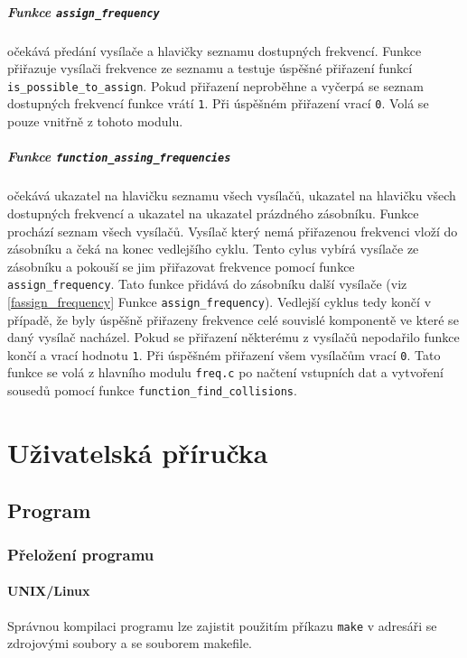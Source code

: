 \documentclass[12pt]{report}
\begin{document}
\cprotect\paragraph{Funkce \verb|assign_frequency|\label{fassign_frequency}}
očekává předání vysílače a hlavičky seznamu dostupných frekvencí. Funkce přiřazuje vysílači frekvence ze seznamu a testuje úspěšné přiřazení funkcí \verb|is_possible_to_assign|. Pokud přiřazení neproběhne a vyčerpá se seznam dostupných frekvencí funkce vrátí \texttt{1}. Při úspěšném přiřazení vrací \texttt{0}. Volá se pouze vnitřně z tohoto modulu.

\cprotect\paragraph{Funkce \verb|function_assing_frequencies|}
očekává ukazatel na hlavičku seznamu všech vysílačů, ukazatel na hlavičku všech dostupných frekvencí a ukazatel na ukazatel prázdného zásobníku. Funkce prochází seznam všech vysílačů. Vysílač který nemá přiřazenou frekvenci vloží do zásobníku a čeká na konec vedlejšího cyklu. Tento cylus vybírá vysílače ze zásobníku a pokouší se jim přiřazovat frekvence pomocí funkce \verb|assign_frequency|. Tato funkce přidává do zásobníku další vysílače (viz \ref{fassign_frequency} Funkce \verb|assign_frequency|). Vedlejší cyklus tedy končí v případě, že byly úspěšně přiřazeny frekvence celé souvislé komponentě ve které se daný vysílač nacházel. Pokud se přiřazení některému z vysílačů nepodařilo funkce končí a vrací hodnotu \texttt{1}. Při úspěšném přiřazení všem vysílačům vrací \texttt{0}. Tato funkce se volá z hlavního modulu \verb|freq.c| po načtení vstupních dat a vytvoření sousedů pomocí funkce \verb|function_find_collisions|.

\chapter{Uživatelská příručka}
\setlength{\parskip}{\baselineskip}
\section{Program}
\subsection{Přeložení programu}
\subsubsection{UNIX/Linux}
Správnou kompilaci programu lze zajistit použitím příkazu \texttt{make} v adresáři se zdrojovými soubory a se souborem makefile.
\end{document}
